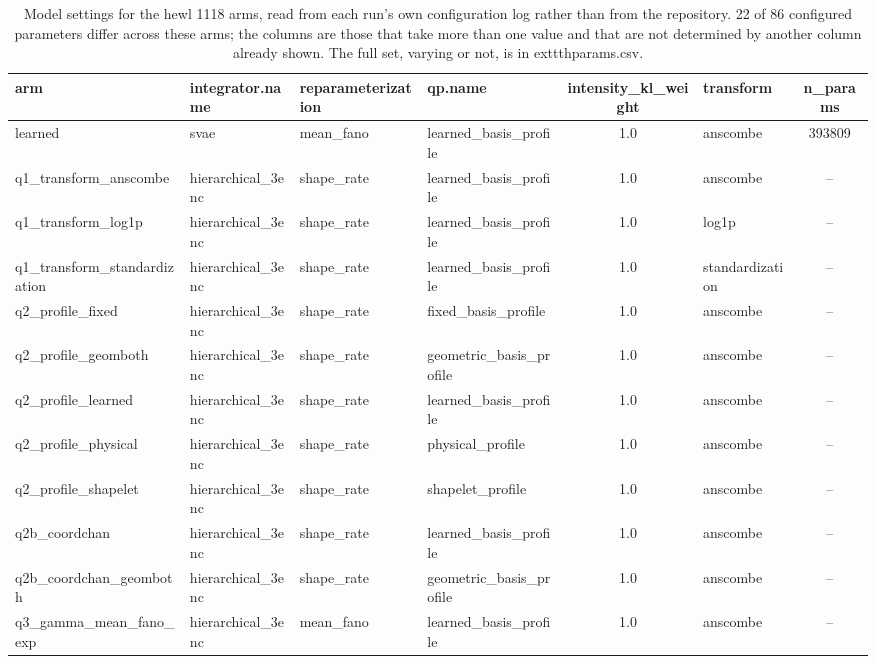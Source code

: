 \begin{table}[htbp]
\centering
\caption{Model settings for the hewl 1118 arms, read from each run's own configuration log rather than from the repository. 22 of 86 configured parameters differ across these arms; the columns are those that take more than one value and that are not determined by another column already shown. The full set, varying or not, is in 	exttt{hparams.csv}.}
\label{tab:hyperparameters_hewl_1118}
\small
\begin{tabular}{@{}l l l l S[table-format=1.2] l S[table-format=6.0]@{}}
\toprule
{arm} & {integrator.name} & {reparameterization} & {qp.name} & {intensity\_kl\_weight} & {transform} & {n\_params} \\
\midrule
{learned} & {svae} & {mean\_fano} & {learned\_basis\_profile} & 1.0 & {anscombe} & 393809 \\
{q1\_transform\_anscombe} & {hierarchical\_3enc} & {shape\_rate} & {learned\_basis\_profile} & 1.0 & {anscombe} & {--} \\
{q1\_transform\_log1p} & {hierarchical\_3enc} & {shape\_rate} & {learned\_basis\_profile} & 1.0 & {log1p} & {--} \\
{q1\_transform\_standardization} & {hierarchical\_3enc} & {shape\_rate} & {learned\_basis\_profile} & 1.0 & {standardization} & {--} \\
{q2\_profile\_fixed} & {hierarchical\_3enc} & {shape\_rate} & {fixed\_basis\_profile} & 1.0 & {anscombe} & {--} \\
{q2\_profile\_geomboth} & {hierarchical\_3enc} & {shape\_rate} & {geometric\_basis\_profile} & 1.0 & {anscombe} & {--} \\
{q2\_profile\_learned} & {hierarchical\_3enc} & {shape\_rate} & {learned\_basis\_profile} & 1.0 & {anscombe} & {--} \\
{q2\_profile\_physical} & {hierarchical\_3enc} & {shape\_rate} & {physical\_profile} & 1.0 & {anscombe} & {--} \\
{q2\_profile\_shapelet} & {hierarchical\_3enc} & {shape\_rate} & {shapelet\_profile} & 1.0 & {anscombe} & {--} \\
{q2b\_coordchan} & {hierarchical\_3enc} & {shape\_rate} & {learned\_basis\_profile} & 1.0 & {anscombe} & {--} \\
{q2b\_coordchan\_geomboth} & {hierarchical\_3enc} & {shape\_rate} & {geometric\_basis\_profile} & 1.0 & {anscombe} & {--} \\
{q3\_gamma\_mean\_fano\_exp} & {hierarchical\_3enc} & {mean\_fano} & {learned\_basis\_profile} & 1.0 & {anscombe} & {--} \\

\end{tabular}
\end{table}
